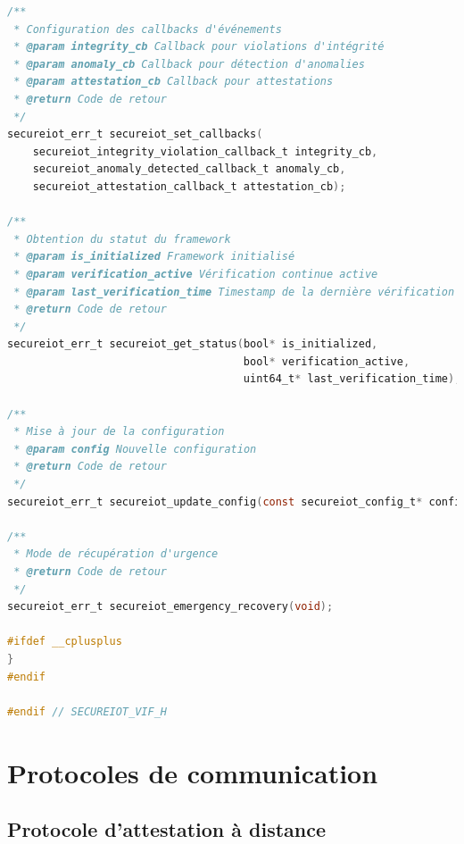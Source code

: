 \begin{lstlisting}[language=C, caption={API publique SecureIoT-VIF}]
/**
 * Configuration des callbacks d'événements
 * @param integrity_cb Callback pour violations d'intégrité
 * @param anomaly_cb Callback pour détection d'anomalies
 * @param attestation_cb Callback pour attestations
 * @return Code de retour
 */
secureiot_err_t secureiot_set_callbacks(
    secureiot_integrity_violation_callback_t integrity_cb,
    secureiot_anomaly_detected_callback_t anomaly_cb,
    secureiot_attestation_callback_t attestation_cb);

/**
 * Obtention du statut du framework
 * @param is_initialized Framework initialisé
 * @param verification_active Vérification continue active
 * @param last_verification_time Timestamp de la dernière vérification
 * @return Code de retour
 */
secureiot_err_t secureiot_get_status(bool* is_initialized,
                                     bool* verification_active,
                                     uint64_t* last_verification_time);

/**
 * Mise à jour de la configuration
 * @param config Nouvelle configuration
 * @return Code de retour
 */
secureiot_err_t secureiot_update_config(const secureiot_config_t* config);

/**
 * Mode de récupération d'urgence
 * @return Code de retour
 */
secureiot_err_t secureiot_emergency_recovery(void);

#ifdef __cplusplus
}
#endif

#endif // SECUREIOT_VIF_H
\end{lstlisting}

\section{Protocoles de communication}

\subsection{Protocole d'attestation à distance}


